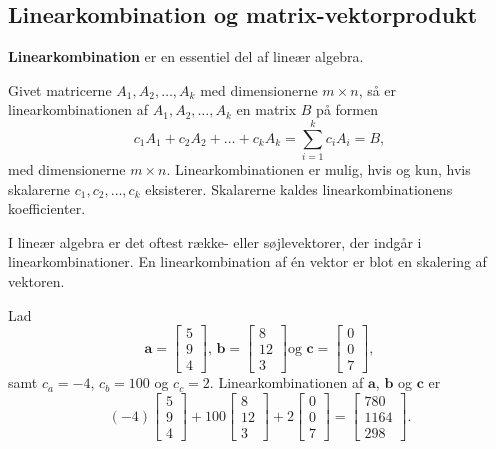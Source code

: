 \subsection{Linearkombination og matrix-vektorprodukt}
%
%
\textbf{Linearkombination} er en essentiel del af lineær algebra. 
%
\begin{defn}{}{}
Givet matricerne $A_1, A_2, \ldots, A_k$ med dimensionerne $m \times n$, så er linearkombinationen af $A_1, A_2, \ldots, A_k$ en matrix $B$ på formen 
%
$$c_1A_1+c_2A_2+\ldots+c_kA_k=\sum\limits_{i=1}^k c_iA_i=B,$$
%
med dimensionerne $m \times n$. 
Linearkombinationen er mulig, hvis og kun, hvis skalarerne $c_1, c_2, \ldots, c_k$ eksisterer. 
Skalarerne kaldes linearkombinationens koefficienter.
\end{defn}
%
%
\noindent 
%
I lineær algebra er det oftest række- eller søjlevektorer, der indgår i linearkombinationer. 
En linearkombination af én vektor er blot en skalering af vektoren.
\\
%
%
\begin{eks}
Lad 
$$
\textbf{a}=
\begin{bmatrix}
5 \\
9 \\
4
\end{bmatrix}
\text{, }
\textbf{b}=
\begin{bmatrix}
8  \\
12 \\ 
3
\end{bmatrix}
\text{og }
\textbf{c}=
\begin{bmatrix}
0 \\
0 \\
7
\end{bmatrix},
$$
samt $c_a=-4$, $c_b=100$ og $c_c=2$. 
Linearkombinationen af $\textbf{a}$, $\textbf{b}$ og $\textbf{c}$ er 
$$
(-4)
\begin{bmatrix}
5 \\ 
9 \\ 
4
\end{bmatrix}
+
100
\begin{bmatrix}
8 \\
12 \\ 
3
\end{bmatrix}
+
2
\begin{bmatrix}
0 \\
0 \\ 
7
\end{bmatrix}
=
\begin{bmatrix}
780 \\
1164 \\ 
298
\end{bmatrix}
\text{.}
$$
\end{eks}
